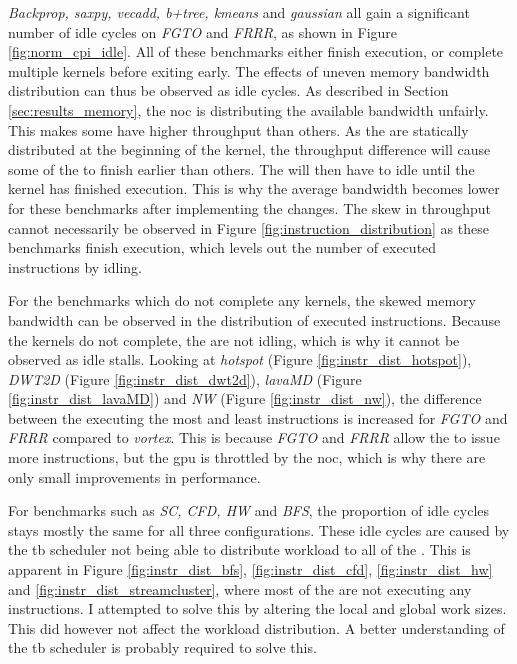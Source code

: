 \textit{Backprop, saxpy, vecadd, b+tree, kmeans} and \textit{gaussian} all gain a significant number of idle cycles on \textit{FGTO} and \textit{FRRR}, as shown in Figure \ref{fig:norm_cpi_idle}. All of these benchmarks either finish execution, or complete multiple kernels before exiting early. The effects of uneven memory bandwidth distribution can thus be observed as idle cycles. As described in Section \ref{sec:results_memory}, the \acrshort{noc} is distributing the available bandwidth unfairly. This makes some  have higher throughput than others. As the  are statically distributed at the beginning of the kernel, the throughput difference will cause some of the  to finish earlier than others. The  will then have to idle until the kernel has finished execution. This is why the average bandwidth becomes lower for these benchmarks after implementing the changes. The skew in throughput cannot necessarily be observed in Figure \ref{fig:instruction_distribution} as these benchmarks finish execution, which levels out the number of executed instructions by  idling.

For the benchmarks which do not complete any kernels, the skewed memory bandwidth can be observed in the distribution of executed instructions. Because the kernels do not complete, the  are not idling, which is why it cannot be observed as idle stalls. Looking at \textit{hotspot} (Figure \ref{fig:instr_dist_hotspot}), \textit{DWT2D} (Figure \ref{fig:instr_dist_dwt2d}), \textit{lavaMD} (Figure \ref{fig:instr_dist_lavaMD}) and \textit{NW} (Figure \ref{fig:instr_dist_nw}), the difference between the  executing the most and least instructions is increased for \textit{FGTO} and \textit{FRRR} compared to \textit{\Gls{vortex}}. This is because \textit{FGTO} and \textit{FRRR} allow the  to issue more instructions, but the \acrshort{gpu} is throttled by the \acrshort{noc}, which is why there are only small improvements in performance. 

For benchmarks such as \textit{SC, CFD, HW} and \textit{BFS}, the proportion of idle cycles stays mostly the same for all three configurations. These idle cycles are caused by the \acrshort{tb} scheduler not being able to distribute workload to all of the . This is apparent in Figure \ref{fig:instr_dist_bfs}, \ref{fig:instr_dist_cfd}, \ref{fig:instr_dist_hw} and \ref{fig:instr_dist_streamcluster}, where most of the  are not executing any instructions. I attempted to solve this by altering the local and global work sizes. This did however not affect the workload distribution. A better understanding of the \acrshort{tb} scheduler is probably required to solve this. 

